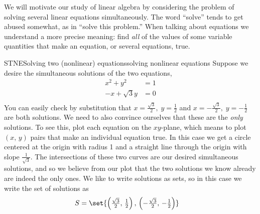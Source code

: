 %
We will motivate our study of linear algebra by considering the problem of solving several linear equations simultaneously.  The word ``solve'' tends to get abused somewhat, as in ``solve this problem.''  When talking about equations we understand a more precise meaning:  find {\em all} of the values of some variable quantities that make an equation, or several equations, true.
%
%
\begin{example}{STNE}{Solving two (nonlinear) equations}{solving nonlinear equations}
Suppose we desire the simultaneous solutions of the two equations,
%
\begin{align*}
x^2+y^2&=1\\
-x+\sqrt{3}y&=0\\
\end{align*}
%
You can easily check by substitution that $x=\tfrac{\sqrt{3}}{2},\;y=\tfrac{1}{2}$ and $x=-\tfrac{\sqrt{3}}{2},\;y=-\tfrac{1}{2}$ are both solutions.  We need to also convince ourselves that these are the {\em only} solutions.  To see this, plot each equation on the $xy$-plane, which means to plot $(x,\,y)$ pairs that make an individual equation true.  In this case we get a circle centered at the origin with radius 1 and a straight line through the origin with slope $\tfrac{1}{\sqrt{3}}$.  The intersections of these two curves are our desired simultaneous solutions, and so we believe from our plot that the two solutions we know already are indeed the only ones.  We like to write solutions as sets, so in this case we write the set of solutions as 
%
\begin{align*}
S&=\set{\left(\tfrac{\sqrt{3}}{2},\,\tfrac{1}{2}\right),\,\left(-\tfrac{\sqrt{3}}{2},\,-\tfrac{1}{2}\right)}
\end{align*}
%
\end{example}
%
